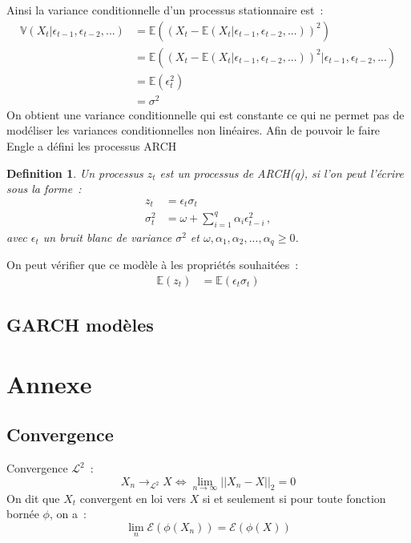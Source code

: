 \documentclass[11pt]{scrartcl} %
\newtheorem{Def}[theorem]{Definition}
\newcommand{\E}[1]{\mathbb{E}\left(#1\right)}
\begin{document}
Ainsi la variance conditionnelle d'un processus stationnaire est~:
\begin{align*}
\mathbb{V}\left(X_t|\epsilon_{t-1},\epsilon_{t-2},...\right)&= \E{\left(X_t-\E{X_t|\epsilon_{t-1},\epsilon_{t-2},...}\right)^2} \\
&= \E{\left(X_t-\E{X_t|\epsilon_{t-1},\epsilon_{t-2},...}\right)^2|\epsilon_{t-1},\epsilon_{t-2},...}\\
&= \E{\epsilon_t^2}\\
&= \sigma^2
\end{align*}
On obtient une variance conditionnelle qui est constante ce qui ne permet pas de modéliser les variances conditionnelles non linéaires. Afin de pouvoir le faire Engle \cite{archEngle} a défini les processus ARCH
\begin{Def}\label{archDef}
Un processus $z_t$ est un processus de ARCH(q), si l'on peut l'écrire sous la forme~:
\begin{align*}
z_t &= \epsilon_t\sigma_t\\
\sigma_t^2 &= \omega + \sum_{i=1}^q \alpha_i \epsilon_{t-i}^2\,,
\end{align*}
avec $\epsilon_t$ un bruit blanc de variance $\sigma^2$ et $\omega,\alpha_1,\alpha_2,...,\alpha_q\geq 0$. 
\end{Def}
On peut vérifier que ce modèle à les propriétés souhaitées~:
\begin{align*}
\E{z_t}&=\E{\epsilon_t\sigma_t}
\end{align*}

\subsection{GARCH modèles}

\section{Annexe}
\subsection{Convergence}
Convergence $\mathcal{L}^2$~:
$$
X_n\rightarrow_{\mathcal{L^2}} X \Leftrightarrow  \lim_{n\rightarrow \infty}||X_n-X||_2=0
$$
On dit que $X_t$ convergent en loi vers $X$ si et seulement si pour toute fonction bornée $\phi$, on a~:~
$$
\lim_{n}\mathcal{E}(\phi(X_n))=\mathcal{E}\left(\phi(X)\right)
$$
\end{document}
